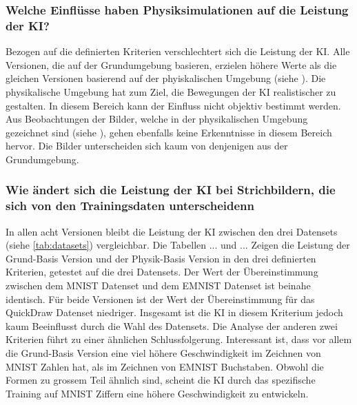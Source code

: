 \subsubsection*{Welche Einflüsse haben Physiksimulationen auf die Leistung der KI?}\label{subsub:d_frage_unter_4}
Bezogen auf die definierten Kriterien verschlechtert sich die Leistung der KI.
Alle Versionen, die auf der Grundumgebung basieren, erzielen höhere Werte als
die gleichen Versionen basierend auf der phyiskalischen Umgebung (siehe
). Die physikalische Umgebung hat zum Ziel, die
Bewegungen der KI realistischer zu gestalten. In diesem Bereich kann der
Einfluss nicht objektiv bestimmt werden. Aus Beobachtungen der Bilder, welche in
der physikalischen Umgebung gezeichnet sind (siehe ), gehen
ebenfalls keine Erkenntnisse in diesem Bereich hervor. Die Bilder unterscheiden
sich kaum von denjenigen aus der Grundumgebung.

\subsubsection*{Wie ändert sich die Leistung der KI bei Strichbildern, die sich von den Trainingsdaten unterscheidenn}\label{subsub:d_frage_unter_5}
In allen acht Versionen bleibt die Leistung der KI zwischen den drei Datensets
(siehe \autoref{tab:datasets}) vergleichbar. Die Tabellen {...} und {...} Zeigen
die Leistung der Grund-Basis Version und der Physik-Basis Version in den drei
definierten Kriterien, getestet auf die drei Datensets. Der Wert der
Übereinstimmung zwischen dem MNIST Datenset und dem EMNIST Datenset ist beinahe
identisch. Für beide Versionen ist der Wert der Übereinstimmung für das
QuickDraw Datenset niedriger. Insgesamt ist die KI in diesem Kriterium jedoch
kaum Beeinflusst durch die Wahl des Datensets. Die Analyse der anderen zwei
Kriterien führt zu einer ähnlichen Schlussfolgerung. Interessant ist, dass vor
allem die Grund-Basis Version eine viel höhere Geschwindigkeit im Zeichnen von
MNIST Zahlen hat, als im Zeichnen von EMNIST Buchstaben. Obwohl die Formen zu
grossem Teil ähnlich sind, scheint die KI durch das spezifische Training auf
MNIST Ziffern eine höhere Geschwindigkeit zu entwickeln. 


